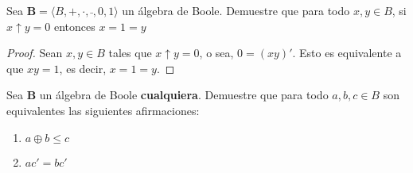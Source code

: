 \begin{exercise}
  \label{ex:nandConsequence}
  Sea $\mathbf{B}=\langle B,+,\cdot,\bar{\ },0,1\rangle$ un álgebra de
  Boole. Demuestre que para todo $x,y\in B$, si $x\uparrow y=0$
  entonces $x=1=y$ 
\end{exercise}

\begin{proof}
  Sean $x,y\in B$ tales que $x\uparrow y=0$, o sea, $0=(xy)'$. Esto es
  equivalente a que $xy=1$, es decir, $x=1=y$.
\end{proof}

\begin{exercise}
  \label{ex:equiv}
  Sea $\mathbf{B}$ un álgebra de Boole
  \textbf{cualquiera}. Demuestre que para todo $a,b,c\in B$ son
  equivalentes las siguientes afirmaciones:
  \begin{enumerate}
  \item $a\oplus b\leq c$
  \item $ac'=bc'$
  \end{enumerate}
\end{exercise}


